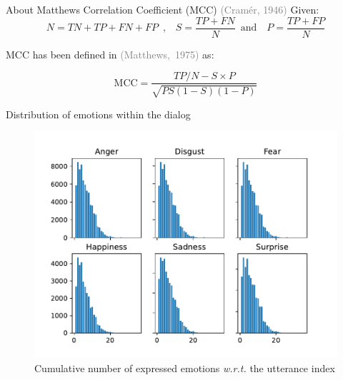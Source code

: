 \documentclass[11pt,aspectratio=169]{beamer}
\begin{document}
    \begin{frame}{About Matthews Correlation Coefficient (MCC) \textcolor{gray}{\footnotesize (Cramér, 1946)}}
        Given:
        \begin{equation}
    N = \mathit{TN}+\mathit{TP}+\mathit{FN}+\mathit{FP} \enspace \text{,} \quad S = \frac{\mathit{TP}+\mathit{FN}}{N} \enspace \text{and} \quad P = \frac{\mathit{TP}+\mathit{FP}}{N}
    \end{equation}
    
    MCC has been defined in \textcolor{gray}{\footnotesize (Matthews,~1975)} as:
    
    \begin{equation}
        \text{MCC} = \frac{\mathit{TP}/ N-S \times P}{\sqrt{P S(1-S)(1-P)}}
    \end{equation}
    \end{frame}
        
    
    \begin{frame}{Distribution of emotions within the dialog}
        \begin{figure}
        \centering
        \includegraphics[scale=0.55]{figures/emo_dist_sp_6_labelled.pdf}
        \caption{\centering Cumulative number of expressed emotions \textit{w.r.t.} the utterance index}
        \label{fig:emo_dist_6}
    \end{figure}
    \end{frame}
    
\end{document}
